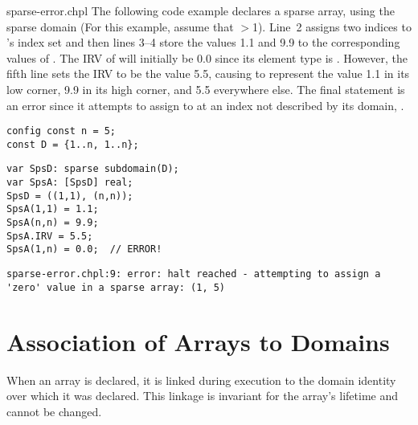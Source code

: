 \begin{chapelexample}{sparse-error.chpl}
The following code example declares a sparse array,  using
the sparse domain  (For this example, assume that
$>$1).  Line~2 assigns two indices to 's index set
and then lines 3--4 store the values 1.1 and 9.9 to the corresponding
values of .  The IRV of  will initially be 0.0
since its element type is .  However, the fifth line sets
the IRV to be the value 5.5, causing  to represent the
value 1.1 in its low corner, 9.9 in its high corner, and 5.5
everywhere else.  The final statement is an error since it attempts to
assign to  at an index not described by its domain,
.

\begin{chapelpre}
\begin{verbatim}
config const n = 5;
const D = {1..n, 1..n};
\end{verbatim}
\end{chapelpre}
\begin{chapel}
\begin{verbatim}
var SpsD: sparse subdomain(D);
var SpsA: [SpsD] real;
SpsD = ((1,1), (n,n));
SpsA(1,1) = 1.1;
SpsA(n,n) = 9.9;
SpsA.IRV = 5.5;
SpsA(1,n) = 0.0;  // ERROR!
\end{verbatim}
\end{chapel}
\begin{chapeloutput}
\begin{verbatim}
sparse-error.chpl:9: error: halt reached - attempting to assign a 'zero' value in a sparse array: (1, 5)
\end{verbatim}
\end{chapeloutput}
\end{chapelexample}



\section{Association of Arrays to Domains}
\label{Association_of_Arrays_to_Domains}

%
%

When an array is declared, it is linked during execution to the domain
identity over which it was declared.  This linkage is invariant for
the array's lifetime and cannot be changed.

